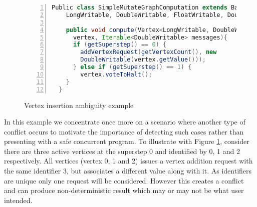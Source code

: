 \begin{figure}[h]
\begin{center}
\begin{lstlisting}[frame=tb, keywordstyle=\color{blue}, backgroundcolor=\color{white}, basicstyle=\footnotesize\ttfamily, language=Java, numbers=left, numberstyle=\tiny\color{black}]
  Public class SimpleMutateGraphComputation extends BasicComputation<
    LongWritable, DoubleWritable, FloatWritable, DoubleWritable> {

    public void compute(Vertex<LongWritable, DoubleWritable, FloatWritable>
      vertex, Iterable<DoubleWritable> messages){ 
      if (getSuperstep() == 0) {
      	addVertexRequest(getVertexCount(), new
      	DoubleWritable(vertex.getValue()));
      } else if (getSuperstep() == 1) {
        vertex.voteToHalt();
    } 
  }
\end{lstlisting}
\end{center}
\caption{Vertex insertion ambiguity example}
\label{fig:vInsert}
\end{figure}


In this example we concentrate once more on a scenario where another type of conflict occurs to motivate the importance of detecting such cases rather than presenting with a safe concurrent program. To illustrate with Figure \ref{fig:vInsert}, consider there are three active vertices at the superstep 0 and identified by 0, 1 and 2 respectively. All vertices (vertex 0, 1 and 2) issues a vertex addition request with the same identifier 3, but associates a different value along with it. As identifiers are unique only one request will be considered. However this creates a conflict and can produce non-deterministic result which may or may not be what user intended. 




